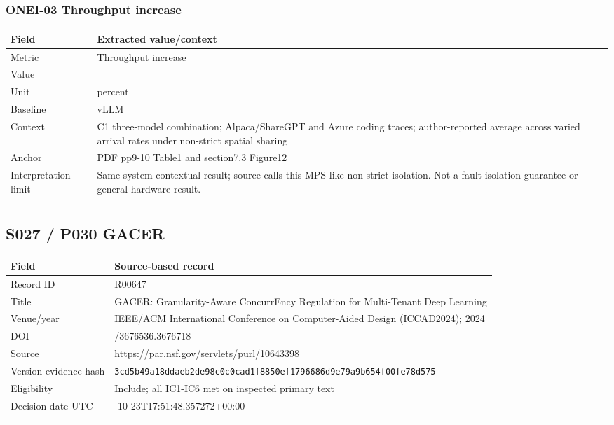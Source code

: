 \subsubsection*{ONEI-03 Throughput increase}
\begin{longtable}{>{\raggedright\arraybackslash}p{}>{\raggedright\arraybackslash}p{}}
\toprule
\textbf{Field} & \textbf{Extracted value/context}\\\midrule\endhead
Metric & Throughput increase\\\addlinespace
Value & 6.6\\\addlinespace
Unit & percent\\\addlinespace
Baseline & vLLM\\\addlinespace
Context & C1 three-model combination;\allowbreak{} Alpaca/ShareGPT and Azure coding traces;\allowbreak{} author-reported average across varied arrival rates under non-strict spatial sharing\\\addlinespace
Anchor & PDF pp9-10 Table1 and section7.3 Figure12\\\addlinespace
Interpretation limit & Same-system contextual result;\allowbreak{} source calls this MPS-like non-strict isolation. Not a fault-isolation guarantee or general hardware result.\\\addlinespace
\bottomrule\end{longtable}
\clearpage\subsection{S027 / P030 GACER}
\cite{s027}
\begin{longtable}{>{\raggedright\arraybackslash}p{}>{\raggedright\arraybackslash}p{}}
\toprule
\textbf{Field} & \textbf{Source-based record}\\\midrule\endhead
Record ID & R00647\\\addlinespace
Title & GACER: Granularity-Aware ConcurrEncy Regulation for Multi-Tenant Deep Learning\\\addlinespace
Venue/year & IEEE/ACM International Conference on Computer-Aided Design (ICCAD2024);\allowbreak{} 2024\\\addlinespace
DOI & 10.1145/3676536.3676718\\\addlinespace
Source & \url{https://par.nsf.gov/servlets/purl/10643398}\\\addlinespace
Version evidence hash & \nolinkurl{3cd5b49a18ddaeb2de98c0c0cad1f8850ef1796686d9e79a9b654f00fe78d575}\\\addlinespace
Eligibility & Include;\allowbreak{} all IC1-IC6 met on inspected primary text\\\addlinespace
Decision date UTC & 2026-10-23T17:51:48.357272+00:00\\\addlinespace
\bottomrule\end{longtable}
